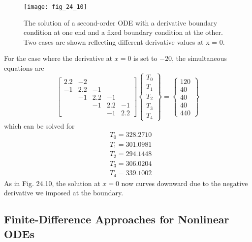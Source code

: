 \documentclass[../main.tex]{subfiles}
\begin{document}
\begin{exmp}
    \begin{figure}[H]
        \centering
        \texttt{[image: fig\_24\_10]}
       \caption{\textsf{The solution of a second-order ODE with a derivative boundary condition at one end and a fixed boundary condition at the other. Two cases are shown reflecting different derivative values at x = 0.}}\label{fig:fig_24_10}
    \end{figure}

    For the case where the derivative at $x=0$ is set to $-20$, the simultaneous equations are
    $$
    \left[\begin{array}{ccccc}
    2.2 & -2 & & & \\
    -1 & 2.2 & -1 & & \\
    & -1 & 2.2 & -1 & \\
    & & -1 & 2.2 & -1 \\
    & & & -1 & 2.2
    \end{array}\right]\left\{\begin{array}{l}
    T_{0} \\
    T_{1} \\
    T_{2} \\
    T_{3} \\
    T_{4}
    \end{array}\right\}=\left\{\begin{array}{c}
    120 \\
    40 \\
    40 \\
    40 \\
    440
    \end{array}\right\}
    $$
    which can be solved for
    $$
    \begin{aligned}
    &T_{0}=328.2710 \\
    &T_{1}=301.0981 \\
    &T_{2}=294.1448 \\
    &T_{3}=306.0204 \\
    &T_{4}=339.1002
    \end{aligned}
    $$
    As in Fig. 24.10, the solution at $x=0$ now curves downward due to the negative derivative we imposed at the boundary.
\end{exmp}\vspace*{\medskipamount}

\subsection{Finite-Difference Approaches for Nonlinear ODEs}
\end{document}

